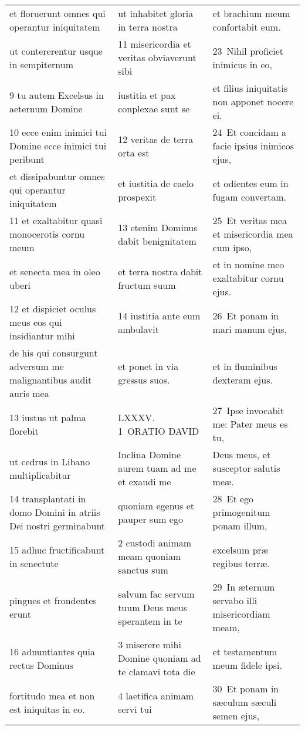 \documentclass{article}
\begin{document}
\begin{longtable}{@{}p{}p{}p{}@{}}
et floruerunt omnes qui operantur iniquitatem	&	ut inhabitet gloria in terra nostra	&	et brachium meum confortabit eum.	\\
ut contererentur usque in sempiternum	&	11 misericordia et veritas obviaverunt sibi	&	23 Nihil proficiet inimicus in eo,	\\
9 tu autem Excelsus in aeternum Domine	&	iustitia et pax conplexae sunt se	&	et filius iniquitatis non apponet nocere ei.	\\
10 ecce enim inimici tui Domine ecce inimici tui peribunt	&	12 veritas de terra orta est	&	24 Et concidam a facie ipsius inimicos ejus,	\\
et dissipabuntur omnes qui operantur iniquitatem	&	et iustitia de caelo prospexit	&	et odientes eum in fugam convertam.	\\
11 et exaltabitur quasi monocerotis cornu meum	&	13 etenim Dominus dabit benignitatem	&	25 Et veritas mea et misericordia mea cum ipso,	\\
et senecta mea in oleo uberi	&	et terra nostra dabit fructum suum	&	et in nomine meo exaltabitur cornu ejus.	\\
12 et dispiciet oculus meus eos qui insidiantur mihi	&	14 iustitia ante eum ambulavit	&	26 Et ponam in mari manum ejus,	\\
de his qui consurgunt adversum me malignantibus audit auris mea	&	et ponet in via gressus suos.	&	et in fluminibus dexteram ejus.	\\
13 iustus ut palma florebit	&	LXXXV. 1 ORATIO DAVID	&	27 Ipse invocabit me: Pater meus es tu,	\\
ut cedrus in Libano multiplicabitur	&	Inclina Domine aurem tuam ad me et exaudi me	&	Deus meus, et susceptor salutis meæ.	\\
14 transplantati in domo Domini in atriis Dei nostri germinabunt	&	quoniam egenus et pauper sum ego	&	28 Et ego primogenitum ponam illum,	\\
15 adhuc fructificabunt in senectute	&	2 custodi animam meam quoniam sanctus sum	&	excelsum præ regibus terræ.	\\
pingues et frondentes erunt	&	salvum fac servum tuum Deus meus sperantem in te	&	29 In æternum servabo illi misericordiam meam,	\\
16 adnuntiantes quia rectus Dominus	&	3 miserere mihi Domine quoniam ad te clamavi tota die	&	et testamentum meum fidele ipsi.	\\
fortitudo mea et non est iniquitas in eo.	&	4 laetifica animam servi tui	&	30 Et ponam in sæculum sæculi semen ejus,	\\

\end{longtable}
\end{document}
